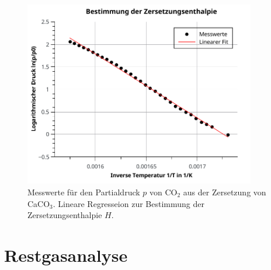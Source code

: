 \begin{figure}[tb]
	\centering\includegraphics[width=0.9\textwidth]{fig/massen_a6_reg.pdf}
	\caption{Messwerte für den Partialdruck $p$ von CO$_{2}$ aus der Zersetzung von CaCO$_{3}$. Lineare Regresseion zur Bestimmung der Zersetzungsenthalpie $H$.}
	\label{fig:v62}
\end{figure}

\section{Restgasanalyse}

